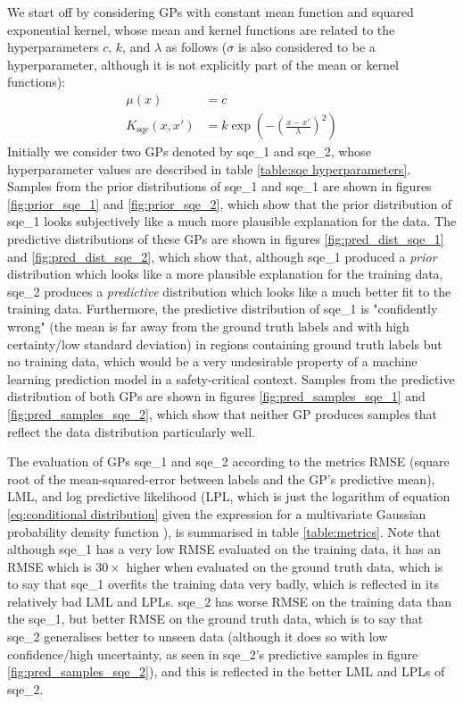 We start off by considering GPs with constant mean function and squared exponential kernel, whose mean and kernel functions are related to the hyperparameters $c$, $k$, and $\lambda$ as follows ($\sigma$ is also considered to be a hyperparameter, although it is not explicitly part of the mean or kernel functions):
\begin{align}
\mu(x) &= c \\
K_{\mathrm{sqe}}(x, x') &= k \exp\left( -\left( \frac{x - x'}{\lambda} \right)^2 \right)
\end{align}
Initially we consider two GPs denoted by sqe\_1 and sqe\_2, whose hyperparameter values are described in table \ref{table:sqe hyperparameters}. Samples from the prior distributions of sqe\_1 and sqe\_1 are shown in figures \ref{fig:prior_sqe_1} and \ref{fig:prior_sqe_2}, which show that the prior distribution of sqe\_1 looks subjectively like a much more plausible explanation for the data. The predictive distributions of these GPs are shown in figures \ref{fig:pred_dist_sqe_1} and \ref{fig:pred_dist_sqe_2}, which show that, although sqe\_1 produced a \emph{prior} distribution which looks like a more plausible explanation for the training data, sqe\_2 produces a \emph{predictive} distribution which looks like a much better fit to the training data. Furthermore, the predictive distribution of sqe\_1 is "confidently wrong" (the mean is far away from the ground truth labels and with high certainty/low standard deviation) in regions containing ground truth labels but no training data, which would be a very undesirable property of a machine learning prediction model in a safety-critical context. Samples from the predictive distribution of both GPs are shown in figures \ref{fig:pred_samples_sqe_1} and \ref{fig:pred_samples_sqe_2}, which show that neither GP produces samples that reflect the data distribution particularly well.

The evaluation of GPs sqe\_1 and sqe\_2 according to the metrics RMSE (square root of the mean-squared-error between labels and the GP's predictive mean), LML, and log predictive likelihood (LPL, which is just the logarithm of equation \ref{eq:conditional distribution} given the expression for a multivariate Gaussian probability density function \cite{bishop2006pattern}), is summarised in table \ref{table:metrics}. Note that although sqe\_1 has a very low RMSE evaluated on the training data, it has an RMSE which is $30\times$ higher when evaluated on the ground truth data, which is to say that sqe\_1 overfits the training data very badly, which is reflected in its relatively bad LML and LPLs. sqe\_2 has worse RMSE on the training data than the sqe\_1, but better RMSE on the ground truth data, which is to say that sqe\_2 generalises better to unseen data (although it does so with low confidence/high uncertainty, as seen in sqe\_2's predictive samples in figure \ref{fig:pred_samples_sqe_2}), and this is reflected in the better LML and LPLs of sqe\_2.

